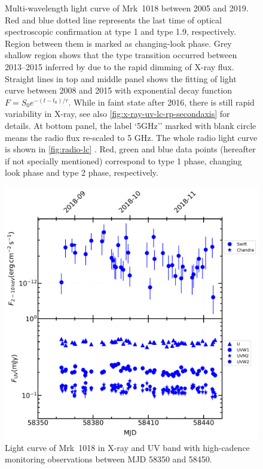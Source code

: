 \documentclass[twocolumn]{aastex63}
\begin{document}
\begin{figure}
    \caption{Multi-wavelength light curve of Mrk~1018 between 2005 and 2019. Red and blue dotted line represents the last time of optical spectroscopic confirmation at type 1 and type 1.9, respectively. Region between them is marked as changing-look phase. Grey shallow region shows that the type transition occurred between 2013--2015 inferred by \citet{2017A&A...607L...9K} due to the rapid dimming of X-ray flux. Straight lines in top and middle panel shows the fitting of light curve between 2008 and 2015 with exponential decay function $F=S_0 e^{-(t-t_0)/\tau }$.  While in faint state after 2016, there is still rapid variability in X-ray, see also \autoref{fig:x-ray-uv-lc-rp-secondaxis} for details. At bottom panel, the label `5GHz'' marked with blank circle means the radio flux re-scaled to 5 GHz. The whole radio light curve is shown in \autoref{fig:radio-lc} . Red, green and blue data points (hereafter if not specially mentioned) correspond to type 1 phase, changing look phase and type 2 phase, respectively.}
    \label{fig:multi-lc-secondaxis}
\end{figure}


\begin{figure}
\centering
	\includegraphics[width=\textwidth]{./pic/subplots-xrt_uvot-radio-second-right-part.png}
    \caption{Light curve of Mrk~1018 in X-ray and UV band with high-cadence monitoring observations between MJD 58350 and 58450.}
    \label{fig:x-ray-uv-lc-rp-secondaxis}
\end{figure}
\end{document}
